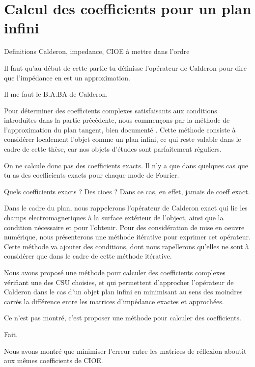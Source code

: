 \chapter{Calcul des coefficients pour un plan infini}
\label{sec:plan}
\minitoc
\newpage
\begin{REM}
    Definitions Calderon, impedance, CIOE à mettre dans l'ordre
  \end{REM}
\begin{REM}
  Il faut qu'au début de cette partie tu définisse l’opérateur de Calderon pour dire que l’impédance en est un approximation.
\end{REM}
\begin{REP}
    Il me faut le B.A.BA de Calderon.
\end{REP}
Pour déterminer des coefficients complexes satisfaisants aux conditions introduites dans la partie précèdente, nous commençons par la méthode de l'approximation du plan tangent, bien documenté \cite{hoppe_impedance_1995,marceaux_high-order_2000,aubakirov_electromagnetic_2014}. Cette méthode consiste à considérer localement l'objet comme un plan infini, ce qui reste valable dans le cadre de cette thèse, car nos objets d'études sont parfaitement réguliers.
\begin{REM}
    On ne calcule donc pas des coefficients exacts. Il n'y a que dans quelques cas que tu as des coefficients exacts pour chaque mode de Fourier.
\end{REM}
\begin{REP}
    Quels coefficients exacts ? Des cioes ? Dans ce cas, en effet, jamais de coeff exact.
\end{REP}

Dans le cadre du plan, nous rappelerons l'opérateur de Calderon exact qui lie les champs electromagnetiques à la surface extérieur de l'object, ainsi que la condition nécessaire et pour l'obtenir.
Pour des considération de mise en oeuvre numérique, nous présenterons une méthode itérative pour exprimer cet opérateur.
Cette méthode va ajouter des conditions, dont nous rapellerons qu'elles ne sont à considérer que dans le cadre de cette méthode itérative.








Nous avons proposé une méthode pour calculer des coefficients complexes vérifiant une des CSU choisies, et qui permettent d'approcher l'opérateur de Calderon dans le cas d'un objet plan infini en minimisant au sens des moindres carrés la différence entre les matrices d'impédance exactes et approchées.
\begin{REM}
    Ce n'est pas montré, c'est proposer une méthode pour calculer des coefficients.
\end{REM}
\begin{REP}
    Fait.
\end{REP}
Nous avons montré que minimiser l'erreur entre les matrices de réflexion aboutit aux mêmes coefficients de CIOE.

